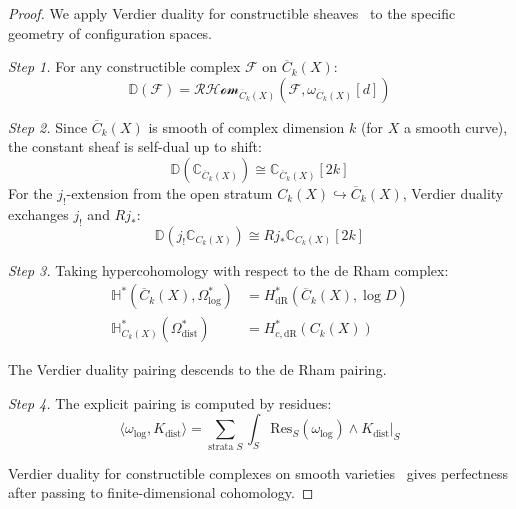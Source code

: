 \begin{proof}
We apply Verdier duality for constructible
sheaves~\cite{KS90} to the specific geometry of
configuration spaces.

\emph{Step 1.}
For any constructible complex $\mathcal{F}$ on $\overline{C}_k(X)$:
\[\mathbb{D}(\mathcal{F}) = \mathcal{RHom}_{\overline{C}_k(X)}(\mathcal{F}, \omega_{\overline{C}_k(X)}[d])\]

\emph{Step 2.}
Since $\overline{C}_k(X)$ is smooth of complex dimension $k$ (for $X$ a smooth curve), the constant sheaf is self-dual up to shift:
\[\mathbb{D}(\mathbb{C}_{\overline{C}_k(X)}) \cong \mathbb{C}_{\overline{C}_k(X)}[2k]\]
For the $j_!$-extension from the open stratum $C_k(X) \hookrightarrow \overline{C}_k(X)$, Verdier duality exchanges $j_!$ and $Rj_*$:
\[\mathbb{D}(j_! \mathbb{C}_{C_k(X)}) \cong Rj_* \mathbb{C}_{C_k(X)}[2k]\]

\emph{Step 3.}
Taking hypercohomology with respect to the de Rham complex:
\begin{align*}
\mathbb{H}^*(\overline{C}_k(X), \Omega^*_{\log}) &= H^*_{\text{dR}}(\overline{C}_k(X), \log D)\\
\mathbb{H}^*_{C_k(X)}(\Omega^*_{\text{dist}}) &= H^*_{c,\text{dR}}(C_k(X))
\end{align*}

The Verdier duality pairing descends to the de Rham pairing.

\emph{Step 4.}
The explicit pairing is computed by residues:
\[\langle \omega_{\text{log}}, K_{\text{dist}} \rangle = \sum_{\text{strata } S} \int_S \text{Res}_S(\omega_{\text{log}}) \wedge K_{\text{dist}}|_S\]

Verdier duality for constructible complexes on smooth varieties~\cite{KS90}
gives perfectness after passing to finite-dimensional cohomology.
\end{proof}

